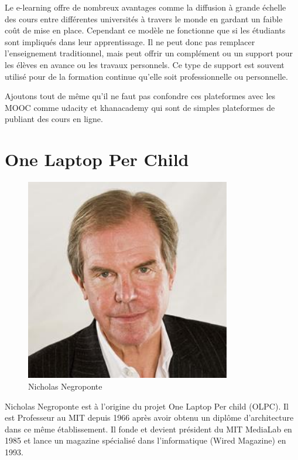 Le e-learning offre de nombreux avantages comme la diffusion à grande échelle des cours entre différentes universités à travers le monde en gardant un faible coût de mise en place. Cependant ce modèle ne fonctionne que si les étudiants sont impliqués dans leur apprentissage. Il ne peut donc pas remplacer l'enseignement traditionnel, mais peut offrir un complément ou un support pour les élèves en avance ou les travaux personnels. Ce type de support est souvent utilisé pour de la formation continue qu'elle soit professionnelle ou personnelle.

Ajoutons tout de même qu'il ne faut pas confondre ces plateformes avec les \gls{MOOC} comme udacity et khanacademy qui sont de simples plateformes de publiant des cours en ligne.

\section{One Laptop Per Child}

\begin{minipage}[H]{0.3\linewidth}
  \begin{figure}[H]
  \centering
  \includegraphics[width=0.8\textwidth]{../resources/illustrations/nicholasnegroponte}
  \caption{\mbox{Nicholas} \mbox{Negroponte}}
  \end{figure}
\end{minipage}
\begin{minipage}[H]{0.7\linewidth}
Nicholas Negroponte est à l'origine du projet \og One Laptop Per child \fg{} (\gls{OLPC}). Il est Professeur au MIT depuis 1966 après avoir obtenu un diplôme d'architecture dans ce même établissement. Il fonde et devient président du MIT MediaLab en 1985 et lance un magazine spécialisé dans l'informatique (Wired Magazine) en 1993\cite{wikipedia_nicholas_negroponte}.
\vspace{.8cm}
\end{minipage}

